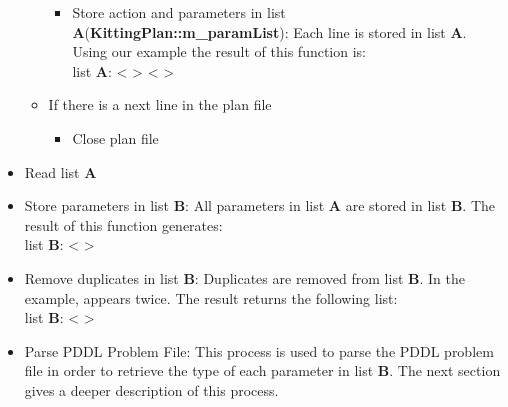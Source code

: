 \begin{itemize}
\begin{itemize}
\begin{itemize}
\item Store action and parameters in list \textbf{A}(\textbf{\small{KittingPlan::m\_paramList}}): Each line is stored in list \textbf{A}. Using our example the result of this function is:\\
    list \textbf{A}: \small{<  > <   >}
\end{itemize}
\item If there is a next line in the plan file
\begin{itemize}
\item Close plan file
\end{itemize}
\end{itemize}
\item Read list \textbf{A}
\item Store parameters in list \textbf{B}: All parameters in list \textbf{A} are stored in list \textbf{B}. The result of this function generates:\\ list \textbf{B}: \small{<    >}
\item Remove duplicates in list \textbf{B}: Duplicates are removed from list \textbf{B}. In the example,  appears twice. The result returns the following list:\\
    list \textbf{B}: \small{<    >}
\item Parse PDDL Problem File: This process is used to parse the PDDL problem file in order to retrieve the type of each parameter in list \textbf{B}. The next section gives a deeper description of this process.
\end{itemize}

\newpage
